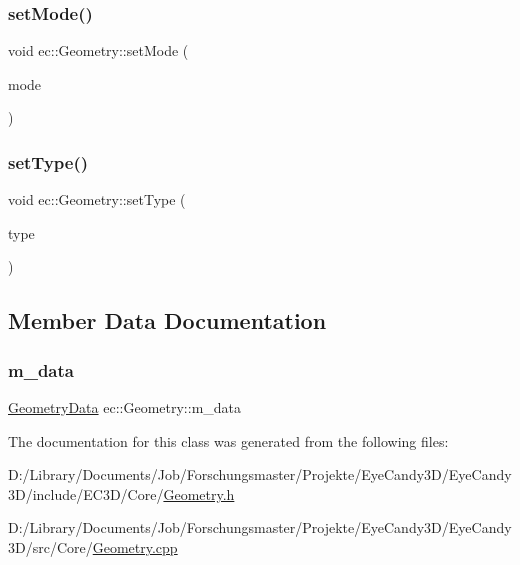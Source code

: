 \subsubsection{\texorpdfstring{set\+Mode()}{setMode()}}
{\footnotesize\ttfamily void ec\+::\+Geometry\+::set\+Mode (\begin{DoxyParamCaption}\item[{G\+Lenum}]{mode }\end{DoxyParamCaption})\hspace{0.3cm}{\ttfamily [protected]}}

\mbox{\label{classec_1_1_geometry_a12c3da280ff11e86a8b07d18a23e0880}} 
\subsubsection{\texorpdfstring{set\+Type()}{setType()}}
{\footnotesize\ttfamily void ec\+::\+Geometry\+::set\+Type (\begin{DoxyParamCaption}\item[{G\+Lenum}]{type }\end{DoxyParamCaption})\hspace{0.3cm}{\ttfamily [protected]}}



\subsection{Member Data Documentation}
\mbox{\label{classec_1_1_geometry_aeb72a472b242d92496f0283cfee17fac}} 
\subsubsection{\texorpdfstring{m\+\_\+data}{m\_data}}
{\footnotesize\ttfamily \mbox{\hyperlink{structec_1_1_geometry_data}{Geometry\+Data}} ec\+::\+Geometry\+::m\+\_\+data\hspace{0.3cm}{\ttfamily [protected]}}



The documentation for this class was generated from the following files\+:\begin{DoxyCompactItemize}
\item 
D\+:/\+Library/\+Documents/\+Job/\+Forschungsmaster/\+Projekte/\+Eye\+Candy3\+D/\+Eye\+Candy3\+D/include/\+E\+C3\+D/\+Core/\mbox{\hyperlink{_geometry_8h}{Geometry.\+h}}\item 
D\+:/\+Library/\+Documents/\+Job/\+Forschungsmaster/\+Projekte/\+Eye\+Candy3\+D/\+Eye\+Candy3\+D/src/\+Core/\mbox{\hyperlink{_geometry_8cpp}{Geometry.\+cpp}}\end{DoxyCompactItemize}
